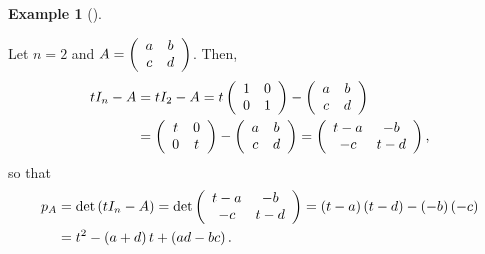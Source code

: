 \documentclass[numbers=enddot,12pt,final,onecolumn,notitlepage]{scrartcl}%
\numberwithin{exer}{subsection}
\theoremstyle{definition}
\newtheorem{exam}[theo]{Example}
\newenvironment{example}[1][]
{\begin{exam}[#1]\begin{leftbar}}
{\end{leftbar}\end{exam}}
\begin{document}
\begin{example}
Let $n=2$ and $A=\left(
\begin{array}
[c]{cc}%
a & b\\
c & d
\end{array}
\right)  $. Then,%
\begin{align*}
tI_{n}-A  & =tI_{2}-A=t\left(
\begin{array}
[c]{cc}%
1 & 0\\
0 & 1
\end{array}
\right)  -\left(
\begin{array}
[c]{cc}%
a & b\\
c & d
\end{array}
\right)  \\
& =\left(
\begin{array}
[c]{cc}%
t & 0\\
0 & t
\end{array}
\right)  -\left(
\begin{array}
[c]{cc}%
a & b\\
c & d
\end{array}
\right)  =\left(
\begin{array}
[c]{cc}%
t-a & -b\\
-c & t-d
\end{array}
\right)  ,
\end{align*}
so that%
\begin{align*}
p_{A}  & =\det\left(  tI_{n}-A\right)  =\det\left(
\begin{array}
[c]{cc}%
t-a & -b\\
-c & t-d
\end{array}
\right)  =\left(  t-a\right)  \left(  t-d\right)  -\left(  -b\right)  \left(
-c\right)  \\
& =t^{2}-\left(  a+d\right)  t+\left(  ad-bc\right)  .
\end{align*}

\end{example}
\end{document}
